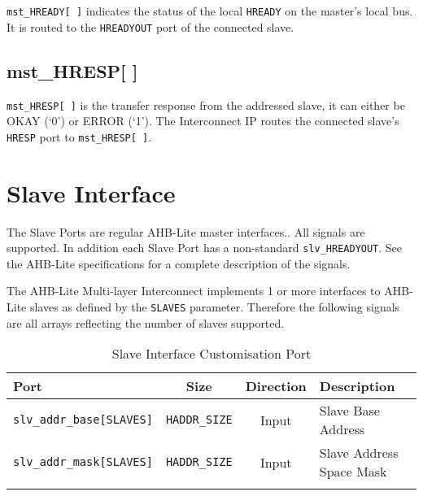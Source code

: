 \texttt{mst\_HREADY[\,]} indicates the status of the local \texttt{HREADY} on the master's
local bus. It is routed to the \texttt{HREADYOUT} port of the connected slave.

\subsection{mst\_HRESP[ ]}\label{mst_hresp}

\texttt{mst\_HRESP[\,]} is the transfer response from the addressed slave, it can
either be OKAY (`0') or ERROR (`1'). The Interconnect IP routes the
connected slave's \texttt{HRESP} port to \texttt{mst\_HRESP[\,]}.

\section{Slave Interface}\label{slave-interface}

The Slave Ports are regular AHB-Lite master interfaces.. All signals are
supported. In addition each Slave Port has a non-standard
\texttt{slv\_HREADYOUT}. See the AHB-Lite specifications for a complete
description of the signals.

The AHB-Lite Multi-layer Interconnect implements 1 or more interfaces to AHB-Lite slaves
as defined by the \texttt{SLAVES} parameter. Therefore the following signals are all
arrays reflecting the number of slaves supported.

\begin{longtable}[]{@{}lccl@{}}
\toprule
Port & Size & Direction & Description\tabularnewline
\midrule
\endhead
\texttt{slv\_addr\_base[SLAVES]} & \texttt{HADDR\_SIZE} & Input  & Slave Base Address\tabularnewline
\texttt{slv\_addr\_mask[SLAVES]} & \texttt{HADDR\_SIZE} & Input  & Slave Address Space Mask\tabularnewline
\bottomrule
\caption{Slave Interface Customisation Port}
\end{longtable}

